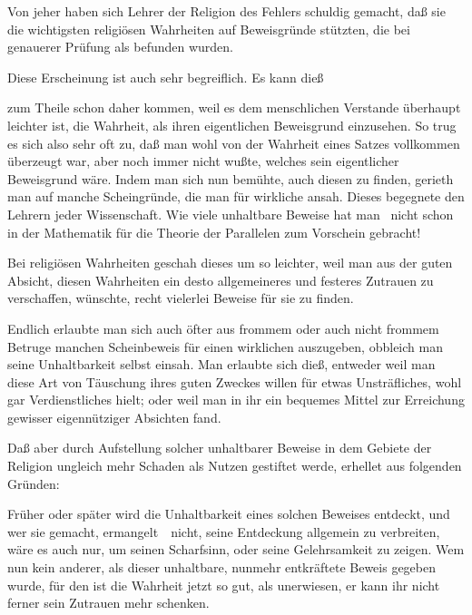 \begin{aufza}
\item Von jeher haben sich Lehrer der Religion des Fehlers schuldig gemacht, daß sie die wichtigsten religiösen Wahrheiten auf Beweisgründe stützten, die bei genauerer Prüfung als  befunden wurden.
\item Diese Erscheinung ist auch sehr begreiflich. Es kann dieß
\begin{aufzb}
\item zum Theile schon daher kommen, weil es dem menschlichen Verstande überhaupt leichter ist, die Wahrheit, als ihren eigentlichen Beweisgrund einzusehen. So trug es sich also sehr oft zu, daß man wohl von der Wahrheit eines Satzes vollkommen überzeugt war, aber noch immer nicht wußte, welches sein eigentlicher Beweisgrund wäre. Indem man sich nun bemühte, auch diesen zu finden, gerieth man auf manche Scheingründe, die man für wirkliche ansah. Dieses begegnete den Lehrern jeder Wissenschaft. Wie viele unhaltbare Beweise hat man \zB\ nicht schon in der Mathematik für die Theorie der Parallelen zum Vorschein gebracht!
\item Bei religiösen Wahrheiten geschah dieses um so leichter, weil man aus der guten Absicht, diesen Wahrheiten ein desto allgemeineres und festeres Zutrauen zu verschaffen, wünschte, recht vielerlei Beweise für sie zu finden.
\item Endlich erlaubte man sich auch öfter aus frommem oder auch nicht frommem Betruge manchen Scheinbeweis für einen wirklichen auszugeben, obbleich man seine Unhaltbarkeit selbst einsah. Man erlaubte sich dieß, entweder weil man diese Art von Täuschung ihres guten Zweckes willen für etwas Unsträfliches, wohl gar Verdienstliches hielt; oder weil man in ihr ein bequemes Mittel zur Erreichung gewisser eigennütziger Absichten fand.
\end{aufzb}
\item Daß aber durch Aufstellung solcher unhaltbarer Beweise in dem Gebiete der Religion ungleich mehr Schaden als Nutzen gestiftet werde, erhellet aus folgenden Gründen:
\begin{aufzb}
\item Früher oder später wird die Unhaltbarkeit eines solchen Beweises entdeckt, und wer sie gemacht, ermangelt~\ nicht, seine Entdeckung allgemein zu verbreiten, wäre es auch nur, um seinen Scharfsinn, oder seine Gelehrsamkeit zu zeigen. Wem nun kein anderer, als dieser unhaltbare, nunmehr entkräftete Beweis gegeben wurde, für den ist die Wahrheit jetzt so gut, als unerwiesen, er kann ihr nicht ferner sein Zutrauen mehr schenken.

\end{aufzb}
\end{aufza}
